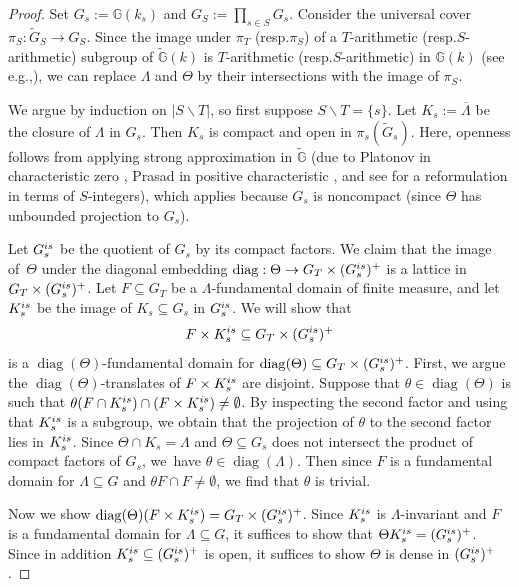\documentclass[11pt]{article}
\newcommand{\eg}{e.g.,\xspace}
\newcommand{\resp}{resp.\xspace}
\numberwithin{equation}{section}\providecommand{\llangle}{\langle\!\langle}\providecommand{\rrangle}{\rangle\!\rangle}\providecommand{\Asterisk}{\ast}
\let\bs\backslash
\newcommand{\bbG}{\ensuremath{\mathbb{G}}}
\DeclareMathOperator{\diag}{diag}
\theoremstyle{definition}
\begin{document}
\begin{proof} Set $G_s:=\bbG(k_s)$ and $G_S:=\prod_{s\in S} G_s$. Consider the universal cover $\pi_S:\widetilde{G}_S\to G_S$. Since the image under $\pi_T$ (\resp $\pi_S$) of a $T$-arithmetic (\resp $S$\nobreakdash-arith\-metic) subgroup of $\widetilde{\bbG}(k)$ is $T$-arithmetic (\resp $S$-arithmetic) in $\bbG(k)$ (see \eg \cite[I.3.2.9]{margulis-book}), we can replace $\Lambda$ and $\Theta$ by their intersections with the image of $\pi_S$.

We argue by induction on $|S\bs T|$, so first suppose $S\bs T=\{s\}$. Let $K_s:=\overline{\Lambda}$ be the closure of $\Lambda$ in $G_s$. Then $K_s$ is compact and open in $\pi_s(\widetilde{G}_s)$. Here, openness follows from applying strong approximation in $\widetilde{\bbG}$ (due to Platonov in characteristic zero \cite{platonov-strongapprox}, Prasad in positive characteristic \cite{prasad-strongapprox}, and see \cite[Prop.\,7.2(2)]{platonov-rapinchuk-book} for a reformulation in terms of $S$-integers), which applies because $G_s$ is noncompact (since $\Theta$ has unbounded projection to $G_s$).

Let $G_s^{\textup{is}}$ be the quotient of $G_s$ by its compact factors. We claim that the image of~$\Theta$ under the diagonal embedding $\diag:\Theta\to G_T \times (G_s^{\textup{is}})^+$ is a lattice in $G_T\times (G_s^{\textup{is}})^+$. Let $F\subseteq G_T$ be a $\Lambda$-fundamental domain of finite measure, and let $K_s^{\textup{is}}$ be the image of $K_s\subseteq G_s$ in $G_s^{\textup{is}}$. We will show that
\[
F\times K_s^{\textup{is}}\subseteq G_T\times (G_s^{\textup{is}})^+
\]
is a $\diag(\Theta)$-fundamental domain for $\diag(\Theta)\subseteq G_T\times (G_s^{\textup{is}})^+$. First, we argue the $\diag(\Theta)$-translates of $F\times K_s^{\textup{is}}$ are disjoint. Suppose that $\theta\in\diag(\Theta)$ is such that $\theta(F\cap K_s^{\textup{is}}) \cap (F\times K_s^{\textup{is}})\neq \emptyset$. By inspecting the second factor and using that $K_s^{\textup{is}}$ is a subgroup, we obtain that the projection of $\theta$ to the second factor lies in $K_s^{\textup{is}}$. Since $\Theta\cap K_s=\Lambda$ and $\Theta\subseteq G_s$ does not intersect the product of compact factors of $G_s$, we~have $\theta\in\diag(\Lambda)$. Then since $F$ is a fundamental domain for $\Lambda\subseteq G$ and $\theta F\cap F\neq\emptyset$, we find that $\theta$ is trivial.

Now we show $\diag(\Theta)(F\times K_s^{\textup{is}})=G_T\times (G_s^{\textup{is}})^+$. Since $K_s^{\textup{is}}$ is $\Lambda$-invariant and $F$ is a fundamental domain for $\Lambda\subseteq G$, it suffices to show that $\Theta K_s^{\textup{is}}= (G_s^{\textup{is}})^+$. Since in addition $K_s^{\textup{is}}\subseteq (G_s^{\textup{is}})^+$ is open, it suffices to show $\Theta$ is dense in $(G_s^{\textup{is}})^+$.


\end{proof}
\end{document}

